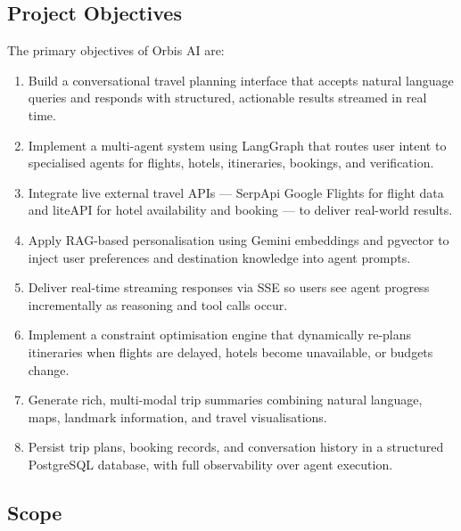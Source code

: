 \documentclass[12pt, a4paper]{article}
\begin{document}
\subsection{Project Objectives}

The primary objectives of Orbis AI are:

\begin{enumerate}[leftmargin=1.5cm, itemsep=0.4em]
  \item Build a conversational travel planning interface that accepts natural language queries and responds with structured, actionable results streamed in real time.
  \item Implement a multi-agent system using LangGraph that routes user intent to specialised agents for flights, hotels, itineraries, bookings, and verification.
  \item Integrate live external travel APIs --- SerpApi Google Flights for flight data and liteAPI for hotel availability and booking --- to deliver real-world results.
  \item Apply RAG-based personalisation using Gemini embeddings and pgvector to inject user preferences and destination knowledge into agent prompts.
  \item Deliver real-time streaming responses via SSE so users see agent progress incrementally as reasoning and tool calls occur.
  \item Implement a constraint optimisation engine that dynamically re-plans itineraries when flights are delayed, hotels become unavailable, or budgets change.
  \item Generate rich, multi-modal trip summaries combining natural language, maps, landmark information, and travel visualisations.
  \item Persist trip plans, booking records, and conversation history in a structured PostgreSQL database, with full observability over agent execution.
\end{enumerate}

\subsection{Scope}
\end{document}

